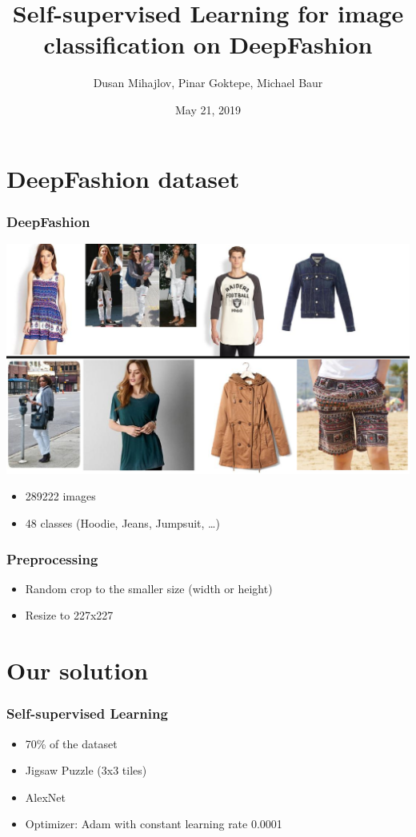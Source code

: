 \documentclass{beamer}
\author{Dusan Mihajlov, Pinar Goktepe, Michael Baur}
\title{Self-supervised Learning for image classification on DeepFashion}
\date{May 21, 2019}
\begin{document}
\maketitle

\frame{\tableofcontents}


\section{DeepFashion dataset}
\begin{frame}
\frametitle{DeepFashion}
\includegraphics[width=\textwidth]{dataset.png}
\begin{itemize}
 \item 289222 images
 \item 48 classes (Hoodie, Jeans, Jumpsuit, \dots)
\end{itemize}
\end{frame}

\begin{frame}
\frametitle{Preprocessing}
\begin{itemize}
 \item Random crop to the smaller size (width or height)
 \item Resize to 227x227
\end{itemize}
\end{frame}

\section{Our solution}
\begin{frame}
\frametitle{Self-supervised Learning}
\begin{itemize}
 \item 70\% of the dataset
 \item Jigsaw Puzzle (3x3 tiles)
 \item AlexNet
 \item Optimizer: Adam with constant learning rate 0.0001
\end{itemize}
\end{frame}
\end{document}
